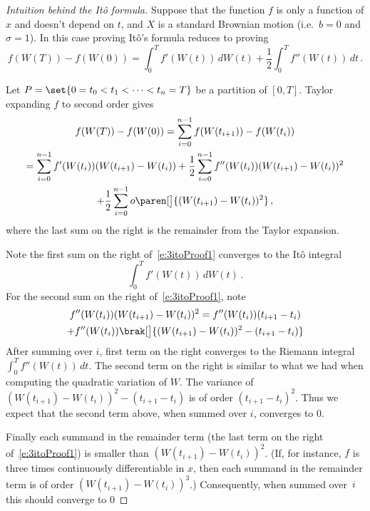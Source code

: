 \begin{proof}[Intuition behind the It\^o formula]
  Suppose that the function $f$ is only a function of $x$ and doesn't depend on $t$, and $X$ is a standard Brownian motion (i.e.\ $b = 0$ and $\sigma = 1$).
  In this case proving It\^o's formula reduces to proving
  \begin{equation*}
    f(W(T)) - f(W(0)) = \int_0^T f'(W(t)) \, dW(t) + \frac{1}{2} \int_0^T f''(W(t)) \, dt \,.
  \end{equation*}

  Let $P = \set{0 = t_0 < t_1 < \cdots < t_n = T}$ be a partition of $[0, T]$.
  Taylor expanding $f$ to second order gives
  \begin{multline}\label{e:3itoProof1}
    f(W(T)) - f(W(0))
      = \sum_{i=0}^{n-1} f(W(t_{i+1})) - f(W(t_i))
    \\
      = \sum_{i=0}^{n-1} f'(W(t_i)) (W(t_{i+1}) - W(t_i))
	+ \frac{1}{2} \sum_{i=0}^{n-1} f''(W(t_i)) (W( t_{i+1}) - W(t_i))^2
    \\
	+ \frac{1}{2} \sum_{i=0}^{n-1} o\paren[\big]{ (W( t_{i+1}) - W(t_i))^2 } \,,
  \end{multline}
  where the last sum on the right is the remainder from the Taylor expansion.

  Note the first sum on the right of~\eqref{e:3itoProof1} converges to the It\^o integral
  \begin{equation*}
    \int_0^T f'(W(t)) \, dW(t)\,.
  \end{equation*}
  For the second sum on the right of~\eqref{e:3itoProof1}, note
  \begin{multline*}
    f''(W(t_i)) (W( t_{i+1}) - W(t_i))^2
      = f''(W(t_i)) (t_{i+1} - t_i)
    \\
	+ f''(W(t_i))\brak[\big]{(W( t_{i+1}) - W(t_i))^2 - (t_{i+1} - t_i)}
  \end{multline*}
  After summing over $i$, first term on the right converges to the Riemann integral $\int_0^T f''(W(t)) \, dt$.
  The second term on the right is similar to what we had when computing the quadratic variation of $W$.
  The variance of $(W( t_{i+1}) - W(t_i))^2 - (t_{i+1} - t_i)$ is of order $(t_{i+1} - t_i)^2$.
  Thus we expect that the second term above, when summed over $i$, converges to $0$.

  Finally each summand in the remainder term (the last term on the right of~\eqref{e:3itoProof1}) is smaller than $(W(t_{i+1}) - W(t_i))^2$.
  (If, for instance, $f$ is three times continuously differentiable in $x$, then each summand in the remainder term is of order $(W(t_{i+1}) - W(t_i))^3$.)
  Consequently, when summed over~$i$ this should converge to $0$ 
\end{proof}

